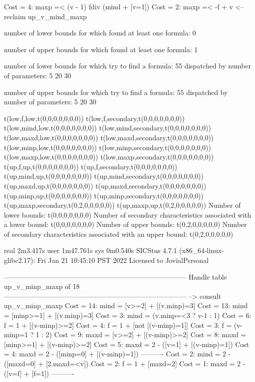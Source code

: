 Cost =  4:  maxp =< (v - 1) fdiv (mind + [v=1]) %
Cost =  2:  maxp =< -f + v
<-- reclaim up_v_mind_maxp

number of lower bounds for which found at least one formula: 0

number of upper bounds for which found at least one formula: 1

number of lower bounds for which try to find a formula: 55
dispatched by number of parameters: 5  20  30

number of upper bounds for which try to find a formula: 55
dispatched by number of parameters: 5  20  30

t(low,f,low,t(0,0,0,0,0,0,0))
t(low,f,secondary,t(0,0,0,0,0,0,0))
t(low,mind,low,t(0,0,0,0,0,0,0))
t(low,mind,secondary,t(0,0,0,0,0,0,0))
t(low,maxd,low,t(0,0,0,0,0,0,0))
t(low,maxd,secondary,t(0,0,0,0,0,0,0))
t(low,minp,low,t(0,0,0,0,0,0,0))
t(low,minp,secondary,t(0,0,0,0,0,0,0))
t(low,maxp,low,t(0,0,0,0,0,0,0))
t(low,maxp,secondary,t(0,0,0,0,0,0,0))
t(up,f,up,t(0,0,0,0,0,0,0))
t(up,f,secondary,t(0,0,0,0,0,0,0))
t(up,mind,up,t(0,0,0,0,0,0,0))
t(up,mind,secondary,t(0,0,0,0,0,0,0))
t(up,maxd,up,t(0,0,0,0,0,0,0))
t(up,maxd,secondary,t(0,0,0,0,0,0,0))
t(up,minp,up,t(0,0,0,0,0,0,0))
t(up,minp,secondary,t(0,0,0,0,0,0,0))
t(up,maxp,secondary,t(0,2,0,0,0,0,0))
t(up,maxp,up,t(0,2,0,0,0,0,0))
Number of lower bounds:                                             t(0,0,0,0,0,0,0)
Number of secondary characteristics associated with a lower bound:  t(0,0,0,0,0,0,0)
Number of upper bounds:                                             t(0,2,0,0,0,0,0)
Number of secondary characteristics associated with an upper bound: t(0,2,0,0,0,0,0)

real	2m3.417s
user	1m47.761s
sys	0m0.540s
SICStus 4.7.1 (x86_64-linux-glibc2.17): Fri Jan 21 10:45:10 PST 2022
Licensed to JovialPersonal


--------------------------------------------------------------------------------
Handle table up_v_minp_maxp of 18
--------------------------------------------------------------------------------
--> consult up_v_minp_maxp
Cost = 14:  mind = [v>=2] + [(v.minp)=3]
Cost = 13:  mind = [minp>=1] + [(v.minp)=3]
Cost =  3:  mind = (v.minp=<3 ? v-1 : 1)
Cost =  6:  f    = 1 + [(v-minp)>=2]
Cost =  4:  f    = 1 + [not [(v-minp)=1]]
Cost =  3:  f    = (v-minp=1 ? 1 : 2)
Cost =  9:  maxd = [v>=2] + [(v-minp)>=2]
Cost =  8:  maxd = [minp>=1] + [(v-minp)>=2]
Cost =  5:  maxd = 2 - ([v=1] + [(v-minp)=1])
Cost =  4:  maxd = 2 - ([minp=0] + [(v-minp)=1])
----------
Cost =  2:  mind = 2 - ([maxd=0] + [2.maxd=<v])
Cost =  2:  f    = 1 + [maxd=2]
Cost =  1:  maxd = 2 - ([v=f] + [f=1])
----------

